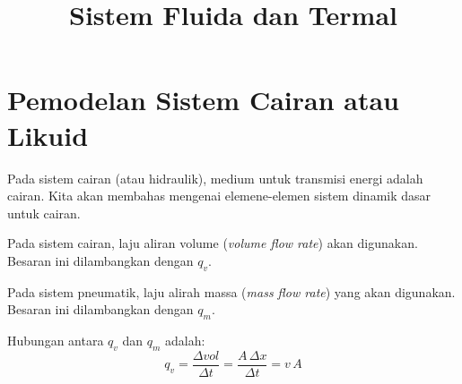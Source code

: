 \documentclass[a4paper]{article}
\begin{document}
\title{Sistem Fluida dan Termal}
\author{}
\maketitle

\section{Pemodelan Sistem Cairan atau Likuid}

Pada sistem cairan (atau hidraulik), medium untuk transmisi energi adalah cairan.
Kita akan membahas mengenai elemene-elemen sistem dinamik dasar untuk cairan.

Pada sistem cairan, laju aliran volume (\textit{volume flow rate}) akan digunakan.
Besaran ini dilambangkan dengan $q_{v}$.

Pada sistem pneumatik, laju alirah massa (\textit{mass flow rate}) yang akan digunakan.
Besaran ini dilambangkan dengan $q_{m}$.

Hubungan antara $q_{v}$ dan $q_{m}$ adalah:
\begin{equation*}
q_v = \frac{\Delta vol}{\Delta t} = \frac{A \, \Delta x}{\Delta t} = v \, A
\end{equation*}
\end{document}
